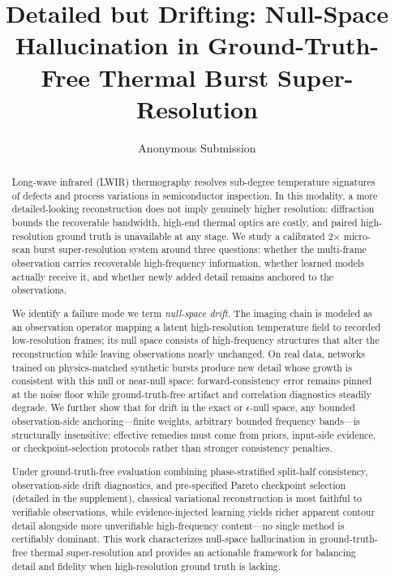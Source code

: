 \documentclass[letterpaper]{article}
\title{Detailed but Drifting: Null-Space Hallucination in Ground-Truth-Free Thermal Burst Super-Resolution}
\author{Anonymous Submission}
\begin{document}
\maketitle

\begin{abstract}
Long-wave infrared (LWIR) thermography resolves sub-degree temperature signatures of defects and process variations in semiconductor inspection. In this modality, a more detailed-looking reconstruction does not imply genuinely higher resolution: diffraction bounds the recoverable bandwidth, high-end thermal optics are costly, and paired high-resolution ground truth is unavailable at any stage. We study a calibrated 2$\times$ micro-scan burst super-resolution system around three questions: whether the multi-frame observation carries recoverable high-frequency information, whether learned models actually receive it, and whether newly added detail remains anchored to the observations.

We identify a failure mode we term \emph{null-space drift}. The imaging chain is modeled as an observation operator mapping a latent high-resolution temperature field to recorded low-resolution frames; its null space consists of high-frequency structures that alter the reconstruction while leaving observations nearly unchanged. On real data, networks trained on physics-matched synthetic bursts produce new detail whose growth is consistent with this null or near-null space: forward-consistency error remains pinned at the noise floor while ground-truth-free artifact and correlation diagnostics steadily degrade. We further show that for drift in the exact or $\epsilon$-null space, any bounded observation-side anchoring---finite weights, arbitrary bounded frequency bands---is structurally insensitive; effective remedies must come from priors, input-side evidence, or checkpoint-selection protocols rather than stronger consistency penalties.

Under ground-truth-free evaluation combining phase-stratified split-half consistency, observation-side drift diagnostics, and pre-specified Pareto checkpoint selection (detailed in the supplement), classical variational reconstruction is most faithful to verifiable observations, while evidence-injected learning yields richer apparent contour detail alongside more unverifiable high-frequency content---no single method is certifiably dominant. This work characterizes null-space hallucination in ground-truth-free thermal super-resolution and provides an actionable framework for balancing detail and fidelity when high-resolution ground truth is lacking.
\end{abstract}








\nocite{thermal-lift-log,aaai2026authorkit}

\end{document}
